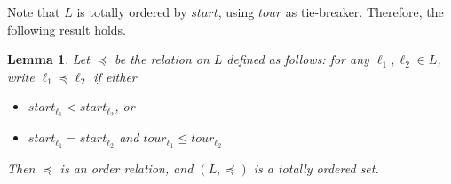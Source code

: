 \documentclass[]{amsart}
\newcommand{\param}{\mathit}
\theoremstyle{plain}
\newtheorem{lemma}{Lemma}
\begin{document}
\noindent Note that $L$ is totally ordered by $\param{start}$, using $\param{tour}$ as tie-breaker. Therefore, the following result holds.

\begin{lemma}\label{lemma:total_order}
Let $\preceq$ be the relation on $L$ defined as follows: for any $\ell_1,\ell_2 \in L$, write $\ell_1\preceq \ell_2$ if either 
\begin{itemize}
    \item $\param{start}_{\ell_1} <\param{start}_{\ell_2} $, or 
    \item $\param{start}_{\ell_1} = \param{start}_{\ell_2}$ and $ \param{tour}_{\ell_1}  \le \param{tour}_{\ell_2}$
\end{itemize}
Then  $\preceq$ is an order relation, and  $(L, \preceq)$ is a totally ordered set.
\end{lemma}
\end{document}
